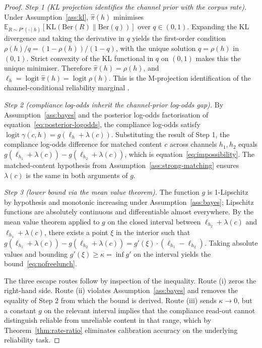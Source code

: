 \documentclass[11pt]{article}
\theoremstyle{definition}
\theoremstyle{remark}
\begin{document}
\begin{proof}
\emph{Step 1 (KL projection identifies the channel prior with the corpus rate).}
Under Assumption~\ref{ass:kl}, $\hat\pi(h)$ minimises
$\mathbb{E}_{R \sim P^\star(\cdot \mid h)}[\mathrm{KL}(\mathrm{Ber}(R) \| \mathrm{Ber}(q))]$
over $q \in (0,1)$. Expanding the KL divergence and taking the derivative in $q$
yields the first-order condition $\rho(h)/q = (1-\rho(h))/(1-q)$, with the unique
solution $q = \rho(h)$ in $(0,1)$. Strict convexity of the KL functional in $q$ on
$(0,1)$ makes this the unique minimiser. Therefore $\hat\pi(h) = \rho(h)$, and
$\ell_h = \operatorname{logit} \hat\pi(h) = \operatorname{logit} \rho(h)$. This is
the M-projection identification of the channel-conditional reliability marginal
\cite{csiszar1975projection,amari2016information,coverthomas2006elements}.

\emph{Step 2 (compliance log-odds inherit the channel-prior log-odds gap).}
By Assumption~\ref{ass:bayes} and the posterior log-odds factorisation of
equation~\eqref{eq:posterior-logodds}, the compliance log-odds satisfy
$\operatorname{logit} \gamma(c, h) = g(\ell_h + \lambda(c))$. Substituting the
result of Step 1, the compliance log-odds difference for matched content $c$
across channels $h_1, h_2$ equals
$g(\ell_{h_1} + \lambda(c)) - g(\ell_{h_2} + \lambda(c))$, which is
equation~\eqref{eq:impossibility}. The matched-content hypothesis from
Assumption~\ref{ass:strong-matching} ensures $\lambda(c)$ is the same in both
arguments of $g$.

\emph{Step 3 (lower bound via the mean value theorem).} The function $g$ is
1-Lipschitz by hypothesis and monotonic increasing under
Assumption~\ref{ass:bayes}; Lipschitz functions are absolutely continuous and
differentiable almost everywhere. By the mean value theorem applied to $g$ on
the closed interval between $\ell_{h_2} + \lambda(c)$ and $\ell_{h_1} + \lambda(c)$,
there exists a point $\xi$ in the interior such that
$g(\ell_{h_1} + \lambda(c)) - g(\ell_{h_2} + \lambda(c)) = g'(\xi) \cdot (\ell_{h_1} - \ell_{h_2})$.
Taking absolute values and bounding $g'(\xi) \ge \kappa = \inf g'$ on the interval
yields the bound~\eqref{eq:nofreelunch}.

The three escape routes follow by inspection of the inequality. Route (i) zeros
the right-hand side. Route (ii) violates Assumption~\ref{ass:bayes} and removes
the equality of Step 2 from which the bound is derived. Route (iii) sends $\kappa
\to 0$, but a constant $g$ on the relevant interval implies that the compliance
read-out cannot distinguish reliable from unreliable content in that range, which
by Theorem~\ref{thm:rate-ratio} eliminates calibration accuracy on the underlying
reliability task.
\end{proof}
\end{document}
